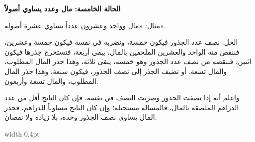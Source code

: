 \documentclass[11pt,a4paper,openany,oneside]{book}
\begin{document}
\noindent\begin{minipage}[t]{0.48\textwidth}
\raggedleft

\begin{Arabic}
\textbf{الحالة الخامسة: مال وعدد يساوي أصولاً}

مثال: «مال وواحد وعشرون عدداً يساوي عشرة أصوله».

الحل: نصف عدد الجذور فيكون خمسة، ونضربه في نفسه فيكون خمسة وعشرين، فننقص منه الواحد والعشرين الملحقين بالمال، يبقى أربعة، فنستخرج جذرها فيكون اثنين، فننقصه من نصف عدد الجذور وهو خمسة، يبقى ثلاثة، وهذا جذر المال المطلوب، والمال تسعة. أو تضيف الجذر إلى نصف الجذور، فيكون سبعة، وهذا جذر المال المطلوب، والمال تسعة وأربعون.

واعلم أنه إذا نصفت الجذور وضربت النصف في نفسه، فإن كان الناتج أقل من عدد الدراهم الملصقة بالمال، فالمسألة مستحيلة؛ وإن كان الناتج مساوياً للدراهم، فجذر المال يساوي نصف الجذور وحده، بلا زيادة ولا نقصان.
\end{Arabic}

\end{minipage}%
\hfill\vrule width 0.4pt\hfill
\end{document}
